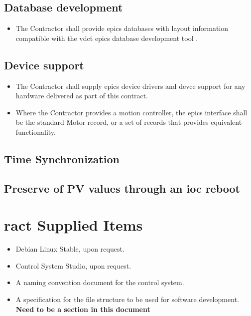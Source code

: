 \documentclass[11pt
  , a4paper
  , article
  , oneside
]{memoir}
\begin{document}
\subsection{Database development}
\begin{itemize}
  \item The Contractor shall provide \Gls{epics} databases with layout information compatible with the \Gls{vdct} \Gls{epics} database development tool \cite{vdct}.
\end{itemize}


\subsection{Device support}
\begin{itemize}
\item The Contractor shall supply \Gls{epics} device drivers and devce support for any hardware delivered as part of this contract.
\item Where the Contractor provides a motion controller, the \Gls{epics} interface shall be the standard Motor record, or a set of records that provides equivalent functionality.
\end{itemize}

\subsection{Time Synchronization}


\subsection{Preserve of PV values through an ioc reboot}



\section{\Gls{ract} Supplied Items}
\begin{itemize}
\item Debian Linux Stable, upon request.
\item Control System Studio, upon request.
\item A naming convention document for the control system.
\item A specification for the file structure to be used for software development. \textbf{Need to be a section in this document}
\end{itemize}
\end{document}
